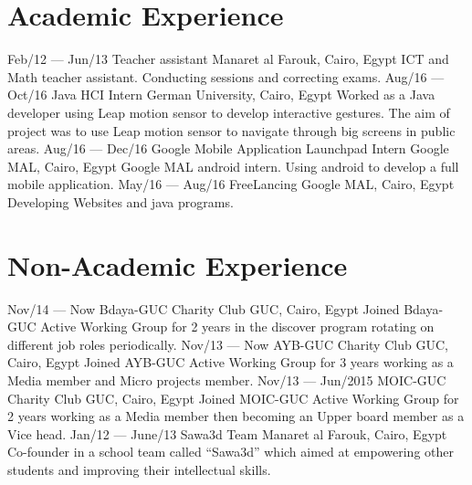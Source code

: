 \documentclass[]{friggeri-cv}
\begin{document}
\section{Academic Experience}
\begin{entrylist}
  \entry
    {Feb/12 — Jun/13}
    {Teacher assistant}
    {Manaret al Farouk, Cairo, Egypt}
    {ICT and Math teacher assistant. Conducting sessions and correcting exams.}
   \entry
    {Aug/16 — Oct/16}
    {Java HCI Intern}
    {German University, Cairo, Egypt}
    {Worked as a Java developer using Leap motion sensor to develop interactive gestures. The aim of project was to use Leap motion sensor to navigate through big screens in public areas.}
   \entry
    {Aug/16 — Dec/16}
    {Google Mobile Application Launchpad Intern}
    {Google MAL, Cairo, Egypt}
    {Google MAL android intern. Using android to develop a full mobile application.}
   \entry
    {May/16 — Aug/16}
    {FreeLancing}
    {Google MAL, Cairo, Egypt}
    {Developing Websites and java programs.}
\end{entrylist}

\section{Non-Academic Experience}
\begin{entrylist}
  \entry
    {Nov/14 — Now}
    {Bdaya-GUC Charity Club}
    {GUC, Cairo, Egypt}
    {Joined Bdaya-GUC Active Working Group for 2 years in the discover program rotating on different job roles periodically.}
  \entry
    {Nov/13 — Now}
    {AYB-GUC Charity Club}
    {GUC, Cairo, Egypt}
    {Joined AYB-GUC Active Working Group for 3 years working as a Media member and Micro projects member.}
  \entry
    {Nov/13 — Jun/2015}
    {MOIC-GUC Charity Club}
    {GUC, Cairo, Egypt}
    {Joined MOIC-GUC Active Working Group for 2 years working as a Media member then becoming an Upper board member as a Vice head.}
  \entry
    {Jan/12 — June/13}
    {Sawa3d Team}
    {Manaret al Farouk, Cairo, Egypt}
    {Co-founder in a school team called “Sawa3d” which aimed at empowering other students and improving their intellectual skills.}
    
\end{entrylist}
\end{document}
